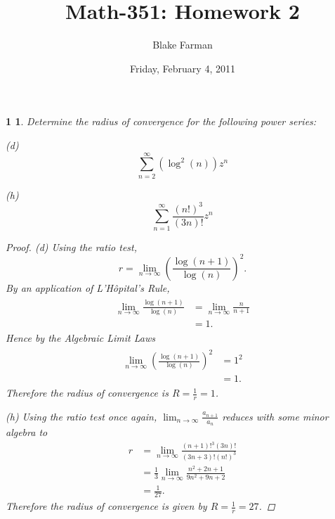 \documentclass[10pt]{amsart}
\author{Blake Farman}
\title{Math-351: Homework 2\\}
\date{Friday, February 4, 2011}\pdfpagewidth 8.5in
\begin{document}
\maketitle

\renewcommand{\qedsymbol}{\(\blacksquare\)}
\newcommand{\C}{\mathbb{C}}
\newcommand{\real}[1]{\operatorname{Re}}

\newtheorem*{1}{1}
\begin{1}
  Determine the radius of convergence for the following power series:
  
  \item{(d)}
    \[\sum_{n=2}^{\infty} (\log^2(n)) z^n\]
  \item{(h)}
    \[\sum_{n=1}^{\infty} \frac{(n!)^3}{(3n)!} z^n\]
  
  \begin{proof}
    \item{(d)}
      Using the ratio test, \[r = \lim_{n\rightarrow\infty}\left(\frac{\log(n+1)}{\log(n)}\right)^2.\]
      By an application of L'H\^opital's Rule, 
      \begin{align*}
        \begin{split}
          \lim_{n\rightarrow\infty} \frac{\log(n+1)}{\log(n)} &= \lim_{n\rightarrow\infty} \frac{n}{n+1}\\
          & = 1.
        \end{split}
      \end{align*}
      Hence by the Algebraic Limit Laws
      \begin{align*}
        \begin{split}
          \lim_{n\rightarrow\infty} \left(\frac{\log(n+1)}{\log(n)}\right)^2 &= 1^2\\
          & = 1.
        \end{split}
      \end{align*}
      Therefore the radius of convergence is \(R = \frac{1}{r} = 1\).
      
    \item{(h)}
      Using the ratio test once again, \(\lim_{n\rightarrow\infty}\frac{a_{n+1}}{a_n}\) reduces with some minor algebra to 
      \begin{align*}
        r &= \lim_{n\rightarrow\infty} \frac{(n+1)!^3(3n)!}{(3n+3)!(n!)^3}\\
        &= \frac{1}{3}\lim_{n\rightarrow\infty}\frac{n^2+2n+1}{9n^2+9n+2}\\
        &= \frac{1}{27}.
      \end{align*}
      Therefore the radius of convergence is given by \(R = \frac{1}{r} = 27\).
    \end{proof}
  \end{1}
\end{document}
